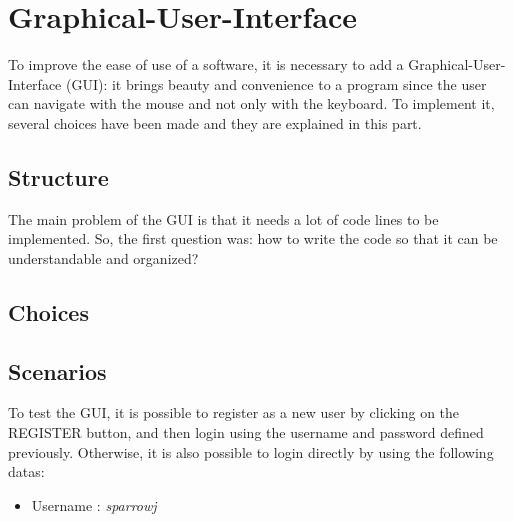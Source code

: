 \section{Graphical-User-Interface}
To improve the ease of use of a software, it is necessary to add a Graphical-User-Interface (GUI): it brings beauty and convenience to a program since the user can navigate with the mouse and not only with the keyboard. To implement it, several choices have been made and they are explained in this part.
\subsection{Structure}
\label{sub:structure}
The main problem of the GUI is that it needs a lot of code lines to be implemented. So, the first question was: how to write the code so that it can be understandable and organized?
\begin{comment}
each panel in a single class
separation creation of panels (and add actionlisteners) and definition of listeners
panelCreator - frame + each panel/menuBar in attributes
launch - definition of listeners
use of menuBar
\end{comment}


\subsection{Choices}
\label{sub:choices}

\begin{comment}
same design for each user panel, why ?
use of menu bars, why ?
use of inner classes and not "if blocks", why ?
use of stack for back button
position/size buttons: use of pixels -> Pb computers
\end{comment}
\subsection{Scenarios}
To test the GUI, it is possible to register as a new user by clicking on the REGISTER button, and then login using the username and password defined previously. Otherwise, it is also possible to login directly by using the following datas:
\begin{itemize}
	\item{}Username : \textit{sparrowj}
\end{itemize}
\label{sub:scenarios}
